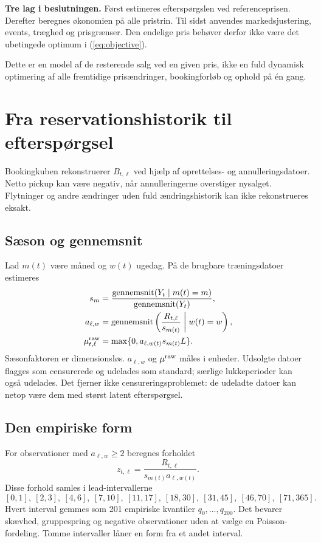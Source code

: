 \documentclass[11pt,a4paper]{article}
\begin{document}
\textbf{Tre lag i beslutningen.} Først estimeres efterspørgslen ved
referenceprisen. Derefter beregnes økonomien på alle pristrin. Til sidst
anvendes markedsjustering, events, træghed og prisgrænser. Den endelige pris
behøver derfor ikke være det ubetingede optimum i (\ref{eq:objective}).

Dette er en model af de resterende salg ved en given pris, ikke en fuld dynamisk
optimering af alle fremtidige prisændringer, bookingforløb og ophold på én gang.

\newpage
\section{Fra reservationshistorik til efterspørgsel}
Bookingkuben rekonstruerer $B_{t,\ell}$ ved hjælp af oprettelses- og
annulleringsdatoer. Netto pickup kan være negativ, når annulleringerne overstiger
nysalget. Flytninger og andre ændringer uden fuld ændringshistorik kan ikke
rekonstrueres eksakt.

\subsection{Sæson og gennemsnit}
Lad $m(t)$ være måned og $w(t)$ ugedag. På de brugbare træningsdatoer estimeres
\begin{align}
s_m&=\frac{\operatorname{gennemsnit}(Y_t\mid m(t)=m)}{\operatorname{gennemsnit}(Y_t)},\\
a_{\ell,w}&=\operatorname{gennemsnit}\left(\frac{R_{t,\ell}}{s_{m(t)}}\;\middle|\;w(t)=w\right),\\
\mu^{\rm raw}_{t,\ell}&=\max\{0,a_{\ell,w(t)}s_{m(t)}L\}.
\end{align}
Sæsonfaktoren er dimensionsløs. $a_{\ell,w}$ og $\mu^{\rm raw}$ måles i enheder.
Udsolgte datoer flagges som censurerede og udelades som standard; særlige
lukkeperioder kan også udelades. Det fjerner ikke censureringsproblemet: de
udeladte datoer kan netop være dem med størst latent efterspørgsel.

\subsection{Den empiriske form}
For observationer med $a_{\ell,w}\geq2$ beregnes forholdet
\begin{equation}z_{t,\ell}=\frac{R_{t,\ell}}{s_{m(t)}a_{\ell,w(t)}}.\end{equation}
Disse forhold samles i lead-intervallerne
\[
[0,1],\ [2,3],\ [4,6],\ [7,10],\ [11,17],\ [18,30],\ [31,45],\ [46,70],\ [71,365].
\]
Hvert interval gemmes som 201 empiriske kvantiler $q_0,\ldots,q_{200}$.
Det bevarer skævhed, gruppespring og negative observationer uden at vælge en
Poisson-fordeling. Tomme intervaller låner en form fra et andet interval.
\end{document}
